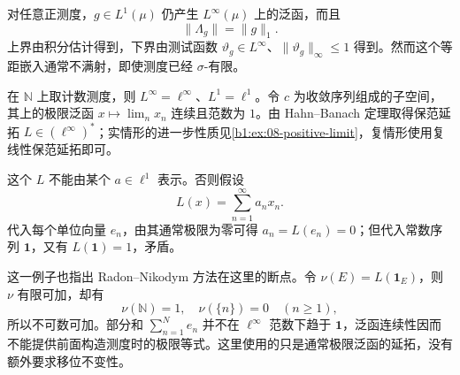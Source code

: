 对任意正测度，\(g\in L^1(\mu)\) 仍产生 \(L^\infty(\mu)\) 上的泛函，而且
\[
 \|\Lambda_g\|=\|g\|_1.
\]
上界由积分估计得到，下界由测试函数 \(\vartheta_g\in L^\infty\)、\(\|\vartheta_g\|_\infty\le1\) 得到。然而这个等距嵌入通常不满射，即使测度已经 \(\sigma\)-有限。

\ProseParagraphBreak

在 \(\mathbb N\) 上取计数测度，则 \(L^\infty=\ell^\infty\)、\(L^1=\ell^1\)。令 \(c\) 为收敛序列组成的子空间，其上的极限泛函 \(x\mapsto\lim_nx_n\) 连续且范数为 \(1\)。由 Hahn--Banach 定理取得保范延拓 \(L\in(\ell^\infty)^*\)；实情形的进一步性质见\cref{b1:ex:08-positive-limit}，复情形使用复线性保范延拓即可。

\ProseParagraphBreak

这个 \(L\) 不能由某个 \(a\in\ell^1\) 表示。否则假设
\[
 L(x)=\sum_{n=1}^{\infty}a_nx_n.
\]
代入每个单位向量 \(e_n\)，由其通常极限为零可得 \(a_n=L(e_n)=0\)；但代入常数序列 \(\mathbf1\)，又有 \(L(\mathbf1)=1\)，矛盾。

\ProseParagraphBreak

这一例子也指出 Radon--Nikodym 方法在这里的断点。令 \(\nu(E)=L(\mathbf1_E)\)，则 \(\nu\) 有限可加，却有
\[
 \nu(\mathbb N)=1,\quad \nu(\{n\})=0\quad(n\ge1),
\]
所以不可数可加。部分和 \(\sum_{n=1}^N e_n\) 并不在 \(\ell^\infty\) 范数下趋于 \(\mathbf1\)，泛函连续性因而不能提供前面构造测度时的极限等式。这里使用的只是通常极限泛函的延拓，没有额外要求移位不变性。
